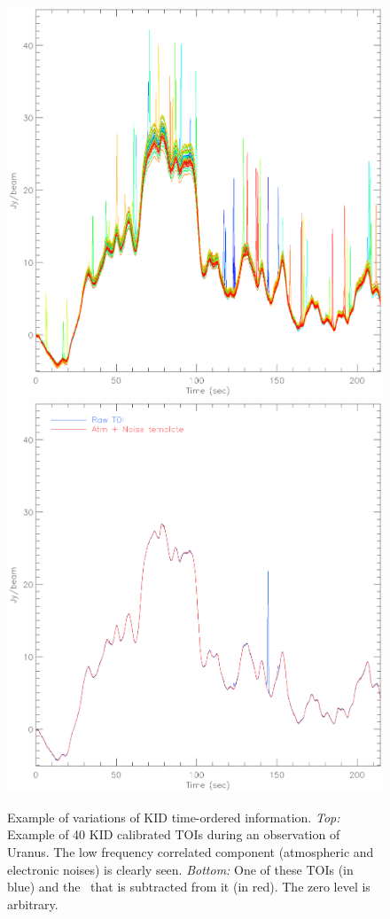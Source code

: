 \begin{figure}[ht!]
\begin{center}
\includegraphics[clip, angle=0, scale=0.4]{Figures/toi_plot.eps}
\includegraphics[clip, angle=0, scale=0.4]{Figures/toi_plot_decorr.eps}
\caption[Example of Time-Ordered-Information]{Example of variations of KID
  time-ordered information. \emph{Top:} Example of 40 KID {\lp calibrated} TOIs during an observation
  of Uranus. The low frequency correlated component (atmospheric and electronic
  noises) is clearly seen. \emph{Bottom:} One of these TOIs (in blue) and the
  \cm\ that is subtracted from it (in red). {\lp The zero level is arbitrary.}}
\label{fig:nika_toi}
\end{center}
\end{figure}

